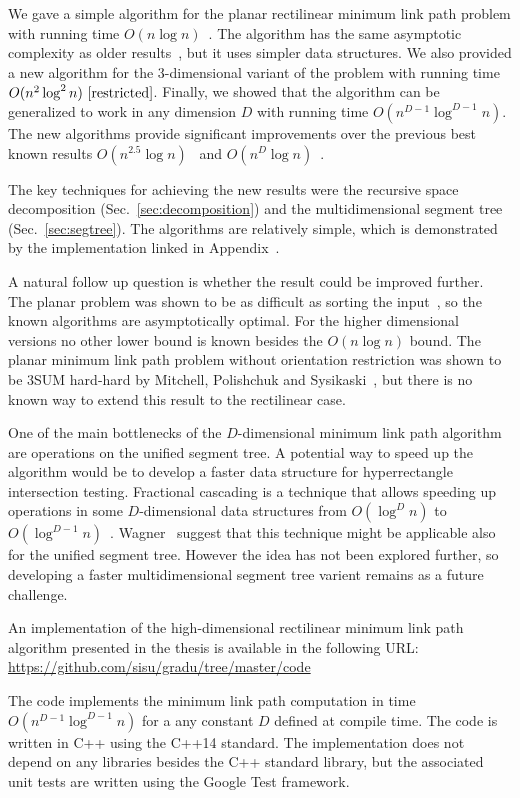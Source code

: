 \documentclass[english,gradu]{tktltiki2018}
\begin{document}
We gave a simple algorithm for the planar rectilinear minimum link path problem with running time $O(n\log n)$~\cite{revisited}.
The algorithm has the same asymptotic complexity as older results~\cite{dasnar,sato}, but it uses simpler data structures.
We also provided a new algorithm for the 3-dimensional variant of the problem with running time $O(n^2\log^2 n)~\cite{restricted}$.
Finally, we showed that the algorithm can be generalized to work in any dimension $D$ with running time $O(n^{D-1}\log^{D-1}n)$.
The new algorithms provide significant improvements over the previous best known results $O(n^{2.5}\log n)$~\cite{wagner} and $O(n^D\log n)$~\cite{de1992}.

The key techniques for achieving the new results were the recursive space decomposition (Sec.~\ref{sec:decomposition}) and the multidimensional segment tree (Sec.~\ref{sec:segtree}).
The algorithms are relatively simple, which is demonstrated by the implementation linked in Appendix~\apxsrc.

A natural follow up question is whether the result could be improved further.
The planar problem was shown to be as difficult as sorting the input~\cite{dasnar}, so the known algorithms are asymptotically optimal.
For the higher dimensional versions no other lower bound is known besides the $O(n\log n)$ bound.
The planar minimum link path problem without orientation restriction was shown to be 3SUM hard-hard by Mitchell, Polishchuk and Sysikaski~\cite{revisited}, but there is no known way to extend this result to the rectilinear case.

One of the main bottlenecks of the $D$-dimensional minimum link path algorithm are operations on the unified segment tree.
A potential way to speed up the algorithm would be to develop a faster data structure for hyperrectangle intersection testing.
Fractional cascading is a technique that allows speeding up operations in some $D$-dimensional data structures from $O(\log^D n)$ to $O(\log^{D-1} n)$~\cite{fractional,ortho}.
Wagner~\cite{unified} suggest that this technique might be applicable also for the unified segment tree.
However the idea has not been explored further, so developing a faster multidimensional segment tree varient remains as a future challenge.



\nocite{*}



\lastpage

\appendices

\pagestyle{empty}


An implementation of the high-dimensional rectilinear minimum link path algorithm presented in the thesis is available in the following URL: \\
\url{https://github.com/sisu/gradu/tree/master/code}

The code implements the minimum link path computation in time $O(n^{D-1}\log^{D-1}n)$ for a any constant $D$ defined at compile time.
The code is written in C++ using the C++14 standard.
The implementation does not depend on any libraries besides the C++ standard library, but the associated unit tests are written using the Google Test framework.
\end{document}
